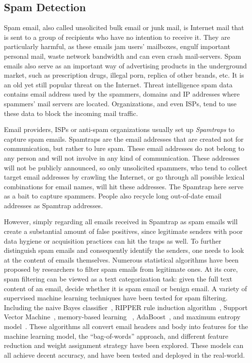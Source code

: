 \subsection{Spam Detection}
Spam email, also called unsolicited bulk email or junk mail, is 
Internet mail that is sent to a group of recipients who have no intention 
to receive it. They are particularly harmful, as these emails jam users' 
mailboxes, engulf important personal mail, waste network bandwidth and 
can even crash mail-servers. Spam emails also serve as an important
way of advertising products in the underground market, such as prescription drugs, 
illegal porn, replica of other brands, etc. It is an old yet still popular
threat on the Internet. Threat intelligence spam data contains email address 
used by the spammers, domains and IP addresses where spammers' mail servers 
are located. Organizations, and even ISPs, tend to use these data to block 
the incoming mail traffic.

Email providers, ISPs or anti-spam organizations usually set up 
\textit{Spamtraps} to capture spam emails. Spamtraps are the email addresses
that are created not for communication, but rather to lure spam. These
email addresses do not belong to any person and will not involve in any
kind of communication. These addresses will not be publicly announced,
so only unsolicited spammers, who tend to collect target email addresses
by crawling the Internet, or go through all possible lexical combinations
for email names, will hit these addresses. The Spamtrap here serve as a 
bait to capture spammers. People also recycle long out-of-date email 
addresses as Spamtrap addresses. 

However, simply regarding all emails received in Spamtrap as spam emails 
will create a substantial amount of false positives, since legitimate 
senders with poor data hygiene or acquisition practices can hit the traps 
as well. To further distinguish spam emails and consequently identify the
senders, one needs to look at the content of emails themselves. Numerous 
statistical algorithms have been proposed by researchers to filter spam
emails from legitimate ones. At its core, spam filtering can be viewed as
a text categorization task: given the full text content of an email, 
decide whether it is spam email or benign email. A variety of supervised
machine learning techniques have been tested for spam filtering. Including the
naive Bayes classifier~\cite{androutsopoulos2000evaluation, sahami1998bayesian, schneider2003comparison}, 
RIPPER rule induction algorithm~\cite{cohen1996learning},
Support Vector Machine~\cite{drucker1999support}, memory-based learning
~\cite{androutsopoulos2000learning}, AdaBoost~\cite{carreras2001boosting},
and maximum entropy model~\cite{zhang2003filtering}. These algorithms all
convert email headers and body into features for the machine learning model, 
the ``bag-of-words'' approach,
and different feature reduction and weight assignment strategy have been
explored. These models can all achieve decent accuracy, and have been tested
and deployed in the real-world. 

